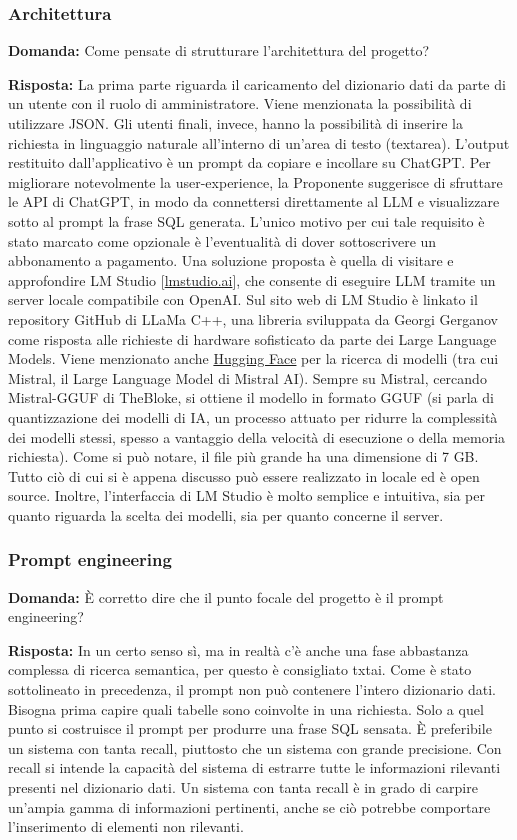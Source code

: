 \subsubsection{Architettura}
\textbf{Domanda:} Come pensate di strutturare l’architettura del progetto?

\textbf{Risposta:} La prima parte riguarda il caricamento del dizionario dati da parte di un utente con il ruolo di amministratore. Viene menzionata la possibilità di utilizzare JSON. Gli utenti finali, invece, hanno la possibilità di inserire la richiesta in linguaggio naturale all’interno di un’area di testo (textarea). L’output restituito dall’applicativo è un prompt da copiare e incollare su ChatGPT. Per migliorare notevolmente la user-experience, la Proponente suggerisce di sfruttare le API di ChatGPT, in modo da connettersi direttamente al LLM e visualizzare sotto al prompt la frase SQL generata. L’unico motivo per cui tale requisito è stato marcato come opzionale è l’eventualità di dover sottoscrivere un abbonamento a pagamento. Una soluzione proposta è quella di visitare e approfondire LM Studio [\href{https://lmstudio.ai}{lmstudio.ai}], che consente di eseguire LLM tramite un server locale compatibile con OpenAI. Sul sito web di LM Studio è linkato il repository GitHub di LLaMa C++, una libreria sviluppata da Georgi Gerganov come risposta alle richieste di hardware sofisticato da parte dei Large Language Models. Viene menzionato anche \href{https://huggingface.co}{Hugging Face} per la ricerca di modelli (tra cui Mistral, il Large Language Model di Mistral AI). Sempre su Mistral, cercando Mistral-GGUF di TheBloke, si ottiene il modello in formato GGUF (si parla di quantizzazione dei modelli di IA, un processo attuato per ridurre la complessità dei modelli stessi, spesso a vantaggio della velocità di esecuzione o della memoria richiesta). Come si può notare, il file più grande ha una dimensione di 7 GB. Tutto ciò di cui si è appena discusso può essere realizzato in locale ed è open source. Inoltre, l’interfaccia di LM Studio è molto semplice e intuitiva, sia per quanto riguarda la scelta dei modelli, sia per quanto concerne il server.

\subsubsection{Prompt engineering}
\textbf{Domanda:} È corretto dire che il punto focale del progetto è il prompt engineering?

\textbf{Risposta:} In un certo senso sì, ma in realtà c’è anche una fase abbastanza complessa di ricerca semantica, per questo è consigliato txtai. Come è stato sottolineato in precedenza, il prompt non può contenere l’intero dizionario dati. Bisogna prima capire quali tabelle sono coinvolte in una richiesta. Solo a quel punto si costruisce il prompt per produrre una frase SQL sensata. È preferibile un sistema con tanta recall, piuttosto che un sistema con grande precisione. Con recall si intende la capacità del sistema di estrarre tutte le informazioni rilevanti presenti nel dizionario dati. Un sistema con tanta recall è in grado di carpire un'ampia gamma di informazioni pertinenti, anche se ciò potrebbe comportare l'inserimento di elementi non rilevanti.

